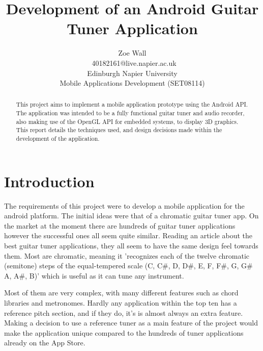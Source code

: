 \documentclass[conference]{acmsiggraph}
\title{Development of an Android Guitar Tuner Application}
\author{Zoe Wall \\\ 40182161@live.napier.ac.uk \\
Edinburgh Napier University \\
Mobile Applications Development (SET08114)}
\begin{document}

\maketitle

\begin{abstract} %
This project aims to implement a mobile application prototype using the Android API. The application was intended to be a fully functional guitar tuner and audio recorder, also making use of the OpenGL API for embedded systems, to display 3D graphics. This report details the techniques used, and design decisions made within the development of the application.
\end{abstract}

\keywordlist

\section{Introduction}

The requirements of this project were to develop a mobile application for the android platform. The initial ideas were that of a chromatic guitar tuner app. On the market at the moment there are hundreds of guitar tuner applications however the successful ones all seem quite similar. Reading an article about the best guitar tuner applications, they all seem to have the same design feel towards them. \cite{bestApps} Most are chromatic, meaning it 'recognizes each of the twelve chromatic (semitone) steps of the equal-tempered scale (C, C\#, D, D\#, E, F, F\#, G, G\# A, A\#, B)' which is useful as it can tune any instrument. \cite{Roland}

Most of them are very complex, with many different features such as chord libraries and metronomes. Hardly any application within the top ten has a reference pitch section, and if they do, it's is almost always an extra feature. Making a decision to use a reference tuner as a main feature of the project would make the application unique compared to the hundreds of tuner applications already on the App Store.
\end{document}
